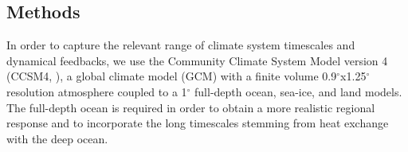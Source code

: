 \documentclass[draft,grl]{AGUTeX}  %
\begin{document}
\begin{article}


%

\section{Methods}

In order to capture the relevant range of climate system timescales and dynamical feedbacks, we use the Community Climate System Model version 4 (CCSM4, \cite{gent11}), a global climate model (GCM) with a finite volume 0.9$^\circ$x1.25$^\circ$ resolution atmosphere coupled to a 1$^\circ$ full-depth ocean, sea-ice, and land models. The full-depth ocean is required in order to obtain a more realistic regional response \citep{mccusker12} and to incorporate the long timescales stemming from heat exchange with the deep ocean. %


\end{article}
\end{document}
